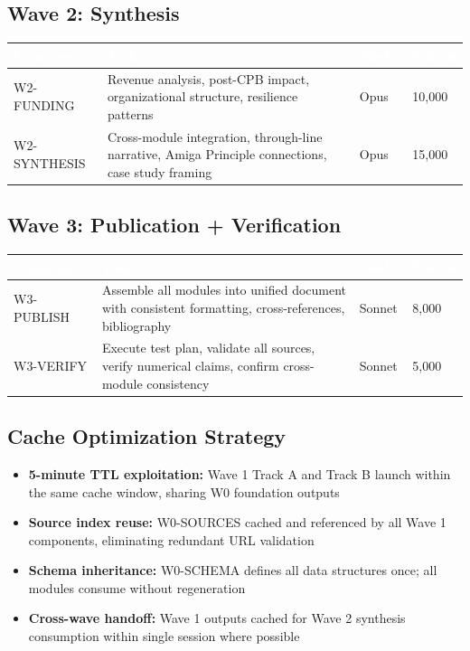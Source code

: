 \documentclass[11pt,letterpaper]{article}
\newcommand{\tableheader}[1]{\textbf{\sffamily\textcolor{white}{#1}}}
\begin{document}
\subsection{Wave 2: Synthesis}

\begin{center}
\begin{tabularx}{\textwidth}{L{2.5cm}XC{1.5cm}C{2cm}}
\toprule
{}
\tableheader{Component} & \tableheader{Task} & \tableheader{Model} & \tableheader{Tokens} \\
\midrule
W2-FUNDING & Revenue analysis, post-CPB impact, organizational structure, resilience patterns & Opus & 10,000 \\
W2-SYNTHESIS & Cross-module integration, through-line narrative, Amiga Principle connections, case study framing & Opus & 15,000 \\
\bottomrule
\end{tabularx}
\end{center}

\subsection{Wave 3: Publication + Verification}

\begin{center}
\begin{tabularx}{\textwidth}{L{2.5cm}XC{1.5cm}C{2cm}}
\toprule
{}
\tableheader{Component} & \tableheader{Task} & \tableheader{Model} & \tableheader{Tokens} \\
\midrule
W3-PUBLISH & Assemble all modules into unified document with consistent formatting, cross-references, bibliography & Sonnet & 8,000 \\
W3-VERIFY & Execute test plan, validate all sources, verify numerical claims, confirm cross-module consistency & Sonnet & 5,000 \\
\bottomrule
\end{tabularx}
\end{center}

\subsection{Cache Optimization Strategy}

\begin{itemize}[leftmargin=2em]
\item \textbf{5-minute TTL exploitation:} Wave 1 Track A and Track B launch within the same cache window, sharing W0 foundation outputs
\item \textbf{Source index reuse:} W0-SOURCES cached and referenced by all Wave 1 components, eliminating redundant URL validation
\item \textbf{Schema inheritance:} W0-SCHEMA defines all data structures once; all modules consume without regeneration
\item \textbf{Cross-wave handoff:} Wave 1 outputs cached for Wave 2 synthesis consumption within single session where possible
\end{itemize}
\end{document}
